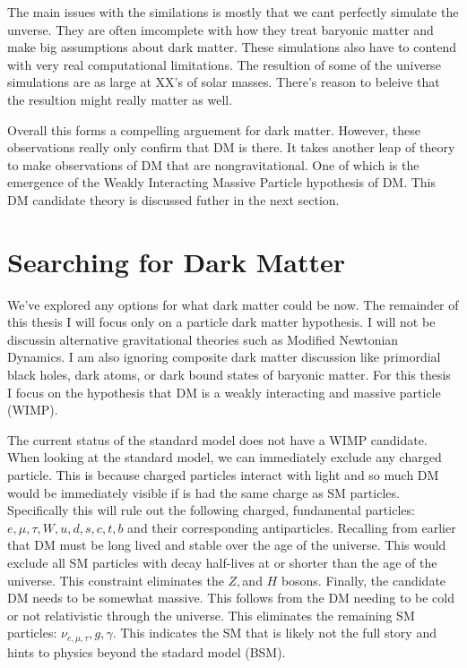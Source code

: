 The main issues with the similations is mostly that we cant perfectly simulate the unverse.
They are often imcomplete with how they treat baryonic matter and make big assumptions about dark matter.
These simulations also have to contend with very real computational limitations.
The resultion of some of the universe simulations are as large at XX's of solar masses.
There's reason to beleive that the resultion might really matter as well. \ns \fu


Overall this forms a compelling arguement for dark matter.
However, these observations really only confirm that DM is there.
It takes another leap of theory to make observations of DM that are nongravitational.
One of which is the emergence of the Weakly Interacting Massive Particle hypothesis of DM.
This DM candidate theory is discussed futher in the next section.

\section{Searching for Dark Matter}\label{sec:dm_search}
We've explored any options for what dark matter could be now.
The remainder of this thesis I will focus only on a particle dark matter hypothesis.
I will not be discussin alternative gravitational theories such as Modified Newtonian Dynamics.
I am also ignoring composite dark matter discussion like primordial black holes, dark atoms, or dark bound states of baryonic matter.
For this thesis I focus on the hypothesis that DM is a weakly interacting and massive particle (WIMP).


The current status of the standard model does not have a WIMP candidate.
When looking at the standard model, we can immediately exclude any charged particle.
This is because charged particles interact with light and so much DM would be immediately visible if is had the same charge as SM particles.
Specifically this will rule out the following charged, fundamental particles: $e,\mu, \tau, W, u, d, s, c, t, b$ and their corresponding antiparticles.
Recalling from earlier that DM must be long lived and stable over the age of the universe.
This would exclude all SM particles with decay half-lives at or shorter than the age of the universe.
This constraint eliminates the $Z, $and $H$ bosons.
Finally, the candidate DM needs to be somewhat massive.
This follows from the DM needing to be cold or not relativistic through the universe.
This eliminates the remaining SM particles: $\nu_{e, \mu, \tau}, g, \gamma$.
This indicates the SM that is likely not the full story and hints to physics beyond the stadard model (BSM).


